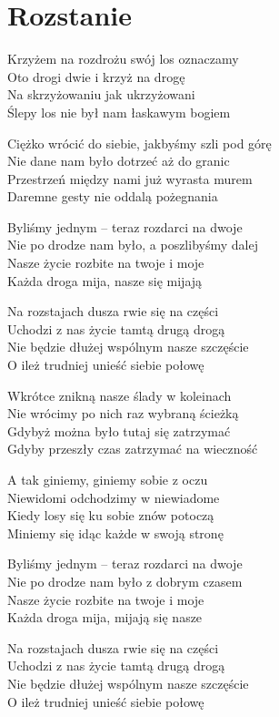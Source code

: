 \section{Rozstanie}
\begin{text}
Krzyżem na rozdrożu swój los oznaczamy\\
Oto drogi dwie i krzyż na drogę\\
Na skrzyżowaniu jak ukrzyżowani\\
Ślepy los nie był nam łaskawym bogiem

Ciężko wrócić do siebie, jakbyśmy szli pod górę\\
Nie dane nam było dotrzeć aż do granic\\
Przestrzeń między nami już wyrasta murem\\
Daremne gesty nie oddalą pożegnania

Byliśmy jednym – teraz rozdarci na dwoje\\
Nie po drodze nam było, a poszlibyśmy dalej\\
Nasze życie rozbite na twoje i moje\\
Każda droga mija, nasze się mijają

Na rozstajach dusza rwie się na części\\
Uchodzi z nas życie tamtą drugą drogą\\
Nie będzie dłużej wspólnym nasze szczęście\\
O ileż trudniej unieść siebie połowę

Wkrótce znikną nasze ślady w koleinach\\
Nie wrócimy po nich raz wybraną ścieżką\\
Gdybyż można było tutaj się zatrzymać\\
Gdyby przeszły czas zatrzymać na wieczność

A tak giniemy, giniemy sobie z oczu\\
Niewidomi odchodzimy w niewiadome\\
Kiedy losy się ku sobie znów potoczą\\
Miniemy się idąc każde w swoją stronę

Byliśmy jednym – teraz rozdarci na dwoje\\
Nie po drodze nam było z dobrym czasem\\
Nasze życie rozbite na twoje i moje\\
Każda droga mija, mijają się nasze

Na rozstajach dusza rwie się na części\\
Uchodzi z nas życie tamtą drugą drogą\\
Nie będzie dłużej wspólnym nasze szczęście\\
O ileż trudniej unieść siebie połowę


\end{text}
